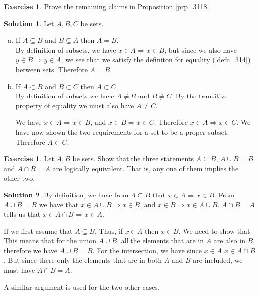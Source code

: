 \documentclass[a4paper, twocolumn]{report}
\newcounter{exercise} \numberwithin{exercise}{section}
\theoremstyle{definition}
\newtheorem{exc}[exercise]{Exercise}
\theoremstyle{solution}
\newtheorem*{sltn}{Solution}
\newcommand{\union}{\cup}
\newcommand{\intrsct}{\cap}
\begin{document}
\begin{exc}
  Prove the remaining claims in Proposition \ref{prp_3118}.
\end{exc}
\begin{sltn}
  Let $A, B, C$ be sets.
  \begin{enumerate}[(a)]
    \item If $A \subseteq B$ and $B \subseteq A$ then $A = B$. \\
      [0.2cm]
      By definition of subsets, we have $x \in A \Rightarrow x \in B$, but
      since we also have $y \in B \Rightarrow y \in A$, we see that we satisfy
      the definiton for equality (\ref{defn_314}) between sets. Therefore $A =
      B$. 

    \item If $A \subset B$ and $B \subset C$ then $A \subset C$. \\
      By definition of subsets we have $A \neq B$ and $B \neq C$. By the
      transitive property of equality we must also have $A \neq C$. 
      
      We have $x \in A \Rightarrow x \in B$, and $x \in B \Rightarrow x \in C$.
      Therefore $x \in A \Rightarrow x \in C$.  We have now shown the two
      requirements for a set to be a proper subset. Therefore $A \subset C$.
  \end{enumerate} 
\end{sltn}

\begin{exc}
  Let $A, B$ be sets. Show that the three statements $A \subseteq B$, $A \union
  B = B$ and $A \intrsct B = A$ are logically equivalent. That is, any one of
  them implies the other two.
  
\end{exc}
\begin{sltn}
  By definition, we have from $A \subseteq B$ that $x \in A \Rightarrow x \in
  B$.  From $A \union B = B$ we have that $x \in A \union B \Rightarrow x \in
  B$, and $x \in B \Rightarrow x \in A \union B$.  $A \intrsct B = A$ tells us
  that $ x \in A \intrsct B \Rightarrow x \in A$.
  
  If we first assume that $A \subseteq B$. Thus, if $x \in A$ then $x \in B$.
  We need to show that This means that for the union $A \union B$, all the
  elements that are in $A$ are also in $B$, therefore we have $A \union B = B$.
  For the intersection, we have since $x \in A$ $x \in A \intrsct B$. But since
  there only the elements that are in both $A$ and $B$ are included, we must
  have $A \intrsct B = A$. 

  A similar argument is used for the two other cases.
\end{sltn}
\end{document}
